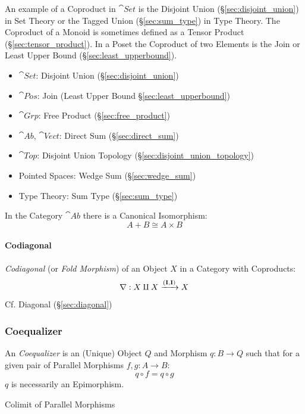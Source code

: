 An example of a Coproduct in $\cat{Set}$ is the Disjoint Union
(\S\ref{sec:disjoint_union}) in Set Theory or the Tagged Union
(\S\ref{sec:sum_type}) in Type Theory. The Coproduct of a Monoid is
sometimes defined as a Tensor Product (\S\ref{sec:tensor_product}). In
a Poset the Coproduct of two Elements is the Join or Least Upper Bound
(\S\ref{sec:least_upperbound}).

\begin{itemize}
\item $\cat{Set}$: Disjoint Union (\S\ref{sec:disjoint_union})
\item $\cat{Pos}$: Join (Least Upper Bound
  \S\ref{sec:least_upperbound})
\item $\cat{Grp}$: Free Product (\S\ref{sec:free_product})
\item $\cat{Ab}$, $\cat{Vect}$: Direct Sum (\S\ref{sec:direct_sum})
\item $\cat{Top}$: Disjoint Union Topology
  (\S\ref{sec:disjoint_union_topology})
\item Pointed Spaces: Wedge Sum (\S\ref{sec:wedge_sum})
\item Type Theory: Sum Type (\S\ref{sec:sum_type})
\end{itemize}

In the Category $\cat{Ab}$ there is a Canonical
Isomorphism:\cite{awodey06}
\[
  A + B \cong A \times B
\]



\paragraph{Codiagonal}\label{sec:codiagonal}\hfill

\emph{Codiagonal} (or \emph{Fold Morphism}) of an Object $X$ in a
Category with Coproducts:
\[
  \nabla : X \amalg X \xrightarrow{(\mathbf{I},\mathbf{I})} X
\]

\fist Cf. Diagonal (\S\ref{sec:diagonal})



\subsubsection{Coequalizer}\label{sec:coequalizer}

An \emph{Coequalizer} is an (Unique) Object $Q$ and Morphism $q: B
\rightarrow Q$ such that for a given pair of Parallel Morphisms $f,g :
A \rightarrow B$:
\[
  q \circ f = q \circ g
\]
$q$ is necessarily an Epimorphism.

Colimit of Parallel Morphisms

